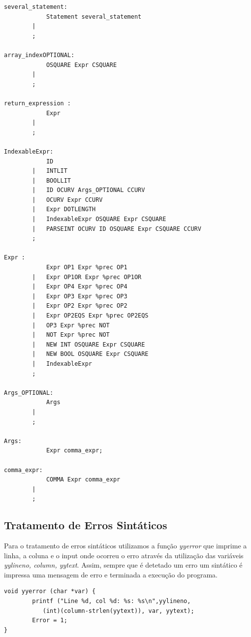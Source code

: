\documentclass[12pt]{article}
\begin{document}
\begin{lstlisting}
several_statement:
            Statement several_statement     
        |                                       
        ;

array_indexOPTIONAL:
            OSQUARE Expr CSQUARE        
        |                                   
        ;

return_expression : 
            Expr    
        |               
        ;

IndexableExpr: 
            ID                                                  
        |   INTLIT                                              
        |   BOOLLIT                                             
        |   ID OCURV Args_OPTIONAL CCURV                        
        |   OCURV Expr CCURV                                    
        |   Expr DOTLENGTH                                      
        |   IndexableExpr OSQUARE Expr CSQUARE                  
        |   PARSEINT OCURV ID OSQUARE Expr CSQUARE CCURV        
        ;

Expr : 
            Expr OP1 Expr %prec OP1                 
        |   Expr OP1OR Expr %prec OP1OR             
        |   Expr OP4 Expr %prec OP4                 
        |   Expr OP3 Expr %prec OP3                 
        |   Expr OP2 Expr %prec OP2                 
        |   Expr OP2EQS Expr %prec OP2EQS           
        |   OP3 Expr %prec NOT                      
        |   NOT Expr %prec NOT                      
        |   NEW INT OSQUARE Expr CSQUARE            
        |   NEW BOOL OSQUARE Expr CSQUARE           
        |   IndexableExpr                           
        ;

Args_OPTIONAL:
            Args    
        |               
        ;

Args:
            Expr comma_expr;

comma_expr: 
            COMMA Expr comma_expr       
        |                                  
        ;
\end{lstlisting}
\subsection{Tratamento de Erros Sintáticos}
Para o tratamento de erros sintáticos utilizamos a função \emph{yyerror} que imprime a linha, a coluna e o input onde ocorreu o erro através da utilização das variáveis \emph{yylineno, column, yytext}. Assim, sempre que é detetado um erro um sintático é impressa uma mensagem de erro e terminada a execução do programa.

\lstset{language=c,caption=Função para tratamento erros sintáticos,label=Estruturas2,numbers=left,frame=single}
\begin{lstlisting}
void yyerror (char *var) {
		printf ("Line %d, col %d: %s: %s\n",yylineno,
           (int)(column-strlen(yytext)), var, yytext);
		Error = 1;
}
\end{lstlisting}  
\end{document}
